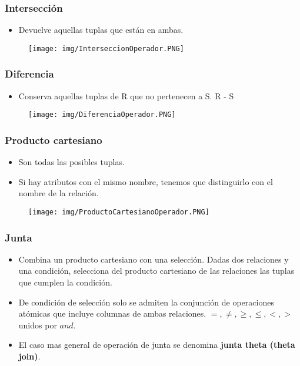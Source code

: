 \subsubsection*{Intersección}
\begin{itemize}
\item Devuelve aquellas tuplas que están en ambas.
\end{itemize}


\begin{figure}[!htb]
    \centering
    \texttt{[image: img/InterseccionOperador.PNG]}
\end{figure}

\subsubsection*{Diferencia}
\begin{itemize}
\item Conserva aquellas tuplas de R que no pertenecen a S. R - S
\end{itemize}


\begin{figure}[!htb]
    \centering
    \texttt{[image: img/DiferenciaOperador.PNG]}
\end{figure}

\subsubsection*{Producto cartesiano}
\begin{itemize}
\item Son todas las posibles tuplas.
\item Si hay atributos con el mismo nombre, tenemos que distinguirlo con el nombre de la relación.
\end{itemize}


\begin{figure}[!htb]
    \centering
    \texttt{[image: img/ProductoCartesianoOperador.PNG]}
\end{figure}

\newpage 

\subsubsection*{Junta}
\begin{itemize}
\item Combina un producto cartesiano con una selección. Dadas dos relaciones y una condición, selecciona del producto cartesiano de las relaciones las tuplas que cumplen la condición.
\item De condición de selección solo se admiten la conjunción de operaciones atómicas que incluye columnas de ambas relaciones. $=,\neq,\geq,\leq,<,>$ unidos por $and$.
\item El caso mas general de operación de junta se denomina \textbf{junta theta (theta join)}.
\end{itemize}


